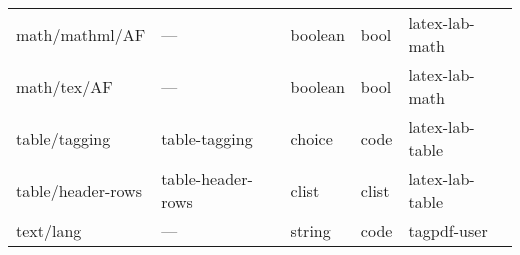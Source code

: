 \begin{tabular}{lllll}
math/mathml/AF      &---           &boolean          &bool  &latex-lab-math\\
math/tex/AF       & ---            &boolean          &bool  &latex-lab-math\\[4pt]\midrule
table/tagging     & table-tagging  &choice           &code  &latex-lab-table\\
table/header-rows & table-header-rows& clist         &clist &latex-lab-table\\[4pt]\midrule
text/lang         & ---             & string         & code &tagpdf-user  \\
\bottomrule
\end{tabular}

